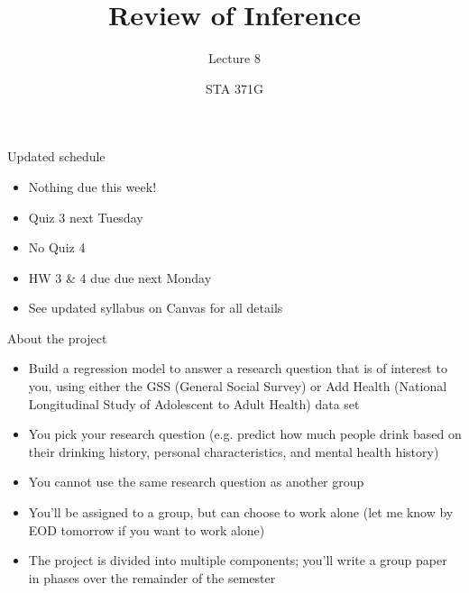 \documentclass{beamer}\usepackage[]{graphicx}\usepackage[]{color}
\title{Review of Inference}
\subtitle{Lecture 8}
\author{STA 371G}
\begin{document}
  
  

  \frame{\maketitle}



  \begin{darkframes}
    \begin{frame}{Updated schedule}
      \begin{itemize}
        \item Nothing due this week!
        \item Quiz 3 next Tuesday
        \item No Quiz 4
        \item HW 3 \& 4 due due next Monday
        \item See updated syllabus on Canvas for all details
      \end{itemize}
    \end{frame}

    \begin{frame}{About the project}
      \begin{itemize}[<+->]
        \item Build a regression model to answer a research question that is of interest to you, using either the GSS (General Social Survey) or Add Health (National Longitudinal Study of Adolescent to Adult Health) data set
        \item You pick your research question (e.g. predict how much people drink based on their drinking history, personal characteristics, and mental health history)
        \item You cannot use the same research question as another group
        \item You'll be assigned to a group, but can choose to work alone (let me know by EOD \alert{tomorrow} if you want to work alone)
        \item The project is divided into multiple components; you'll write a group paper in phases over the remainder of the semester
      \end{itemize}
    \end{frame}


\end{darkframes}
\end{document}
